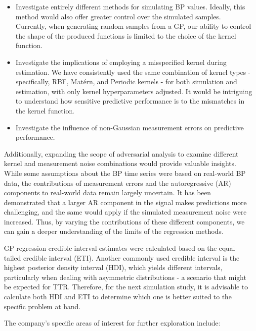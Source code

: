 \begin{itemize}
    \item Investigate entirely different methods for simulating BP values.
    Ideally, this method would also offer greater control over the simulated samples.
    Currently, when generating random samples from a GP, our ability to control the shape of the produced
    functions is limited to the choice of the kernel function.

    \item Investigate the implications of employing a misspecified kernel during estimation.
    We have consistently used the same combination of kernel types - specifically, RBF, Matérn, and Periodic kernels -
    for both simulation and estimation, with only kernel hyperparameters adjusted.
    It would be intriguing to understand how sensitive predictive performance is to the mismatches in
    the kernel function.

    \item Investigate the influence
    of non-Gaussian measurement errors on predictive performance.
\end{itemize}

Additionally, expanding the scope of adversarial analysis to examine different
kernel and measurement noise combinations would provide valuable insights.
While some assumptions about the BP time series were based on real-world BP data,
the contributions of measurement errors and the autoregressive (AR) components
to real-world data remain largely uncertain.
It has been demonstrated that a larger AR component in the signal makes predictions
more challenging, and the same would apply if the simulated measurement noise were increased.
Thus, by varying the contributions of these different components,
we can gain a deeper understanding of the limits of the regression methods.

GP regression credible interval estimates were calculated based on the equal-tailed
credible interval (ETI). Another commonly used credible interval is
the highest posterior density interval (HDI), which yields different intervals,
particularly when dealing with asymmetric distributions - a scenario that might be expected for TTR.
Therefore, for the next simulation study, it is advisable to calculate both HDI and ETI
to determine which one is better suited to the specific problem at hand.

The company's specific areas of interest for further exploration include:


